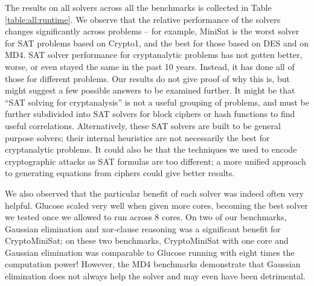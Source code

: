 The results on all solvers across all the benchmarks is collected in Table \ref{table:all:runtime}. We observe that the relative performance of the solvers changes significantly across problems -- for example, MiniSat is the worst solver for SAT problems based on Crypto1, and the best for those based on DES and on MD4. SAT solver performance for cryptanalytic problems has not gotten better, worse, or even stayed the same in the past 10 years. Instead, it has done all of those for different problems. Our results do not give proof of why this is, but might suggest a few possible answers to be examined further. It might be that ``SAT solving for cryptanalysis'' is not a useful grouping of problems, and must be further subdivided into SAT solvers for block ciphers or hash functions to find useful correlations. Alternatively, these SAT solvers are built to be general purpose solvers; their internal heuristics are not necessarily the best for cryptanalytic problems. It could also be that the techniques we used to encode cryptographic attacks as SAT formulas are too different; a more unified approach to generating equations from ciphers could give better results.

We also observed that the particular benefit of each solver was indeed often very helpful. Glucose scaled very well when given more cores, becoming the best solver we tested once we allowed to run across 8 cores. On two of our benchmarks, Gaussian elimination and xor-clause reasoning was a significant benefit for CryptoMiniSat; on these two benchmarks, CryptoMiniSat with one core and Gaussian elimination was comparable to Glucose running with eight times the computation power! However, the MD4 benchmarks demonstrate that Gaussian elimination does not always help the solver and may even have been detrimental.
